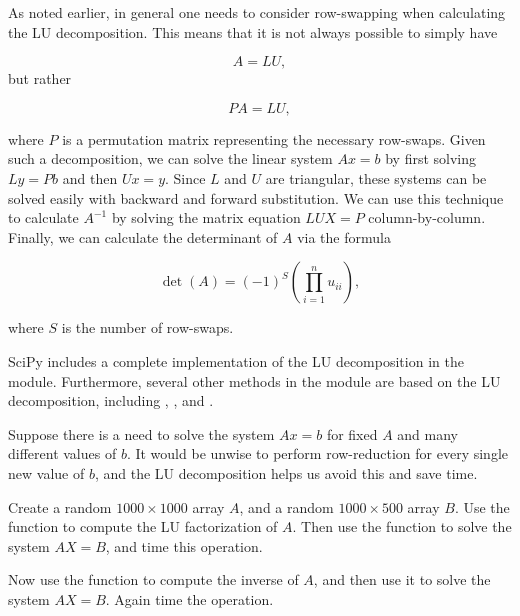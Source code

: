As noted earlier, in general one needs to consider row-swapping when
calculating the LU decomposition. This means that it is not always possible to simply have

\[
A = LU,
\]
but rather

\[
PA = LU,
\]

where $P$ is a permutation matrix representing the necessary row-swaps. Given such a decomposition, we can solve the linear system $Ax = b$ by
first solving $Ly = Pb$ and then $Ux = y$. Since $L$ and $U$ are triangular, these systems can be solved easily with backward and forward substitution. We can use this technique to calculate $A^{-1}$ by solving the matrix equation $LUX = P$ column-by-column. Finally, we can calculate the determinant of $A$ via the formula

\[
\det(A) = (-1)^S\left(\displaystyle\prod_{i=1}^nu_{ii}\right),
\]

where $S$ is the number of row-swaps.

SciPy includes a complete implementation of the LU decomposition in the  module. Furthermore, several other methods in the  module are based on the LU decomposition, including , , and .

\begin{problem}
\label{prob:Solve}
Suppose there is a need to solve the system $Ax = b$ for fixed $A$ and many different values of $b$. It would be unwise to perform row-reduction for every single new value of $b$, and the LU decomposition helps us avoid this and save time.

Create a random $1000 \times 1000$ array $A$, and a random $1000 \times 500$ array $B$. Use the  function to compute the LU factorization of $A$. Then use the  function to solve the system $AX = B$, and time this operation. 

Now use the  function to compute the inverse of $A$, and then use it to solve the system $AX = B$. Again time the operation. 

\end{problem}

%

